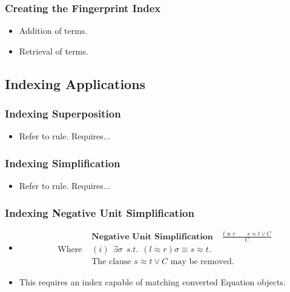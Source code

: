 \documentclass[10pt,xcolor={dvipsnames}]{beamer}
\begin{document}
\begin{NoHyper}
\begin{frame}
  \frametitle{Creating the Fingerprint Index}
  \begin{itemize}
  \item<1-> Addition of terms.
  \item<2-> Retrieval of terms.
  \end{itemize}
\end{frame}

\subsection{Indexing Applications}
\begin{frame}
  \frametitle{Indexing Superposition}
  \begin{itemize}
  \item<1-> Refer to rule. Requires...
  \end{itemize}
\end{frame}

\begin{frame}
  \frametitle{Indexing Simplification}
  \begin{itemize}
  \item<1-> Refer to rule. Requires...
  \end{itemize}
\end{frame}

\begin{frame}
  \frametitle{Indexing Negative Unit Simplification}
  \begin{itemize}
  \item<1->[] 
\begin{align*}
&\textbf{Negative Unit Simplification}\ \ \ \ \ \frac{l\not\approx r \quad \quad s \approx t  \lor C}{C}\\
\text{Where } &(i)\ \  \exists \sigma\ \  s.t.\ \  (l \approx r)\sigma \equiv s \approx t.\\
&\text{The clause $s \approx t  \lor C$ may be removed.}
\end{align*}
  \item<2-> This requires an index capable of matching converted Equation objects.
  \end{itemize}
\end{frame}


\end{NoHyper}
\end{document}
